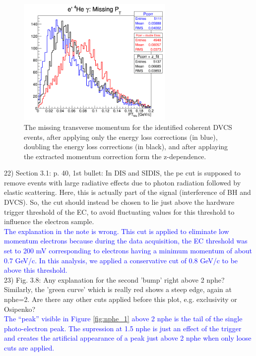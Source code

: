 \begin{figure}[tbp]
   \centering
   \includegraphics[height=6.2cm]{fig/Coh_e4Hegamma_PT_Mis.png}
   \caption{The missing transverse momentum for the identified coherent DVCS 
      events, after applying only the energy loss corrections (in blue), 
      doubling the energy loss corrections (in black), and after applaying the 
   extracted momentum correction form the z-dependence.}
   \label{fig:dvcs_mom_corr}
\end{figure}


22) Section 3.1: p. 40, 1st bullet: In DIS and SIDIS, the pe cut is supposed to 
remove events with large radiative effects due to photon radiation followed by 
elastic scattering. Here, this is actually part of the signal (interference of 
BH and DVCS). So, the cut should instead be chosen to lie just above the 
hardware trigger threshold of the EC, to avoid fluctuating values for this 
threshold to influence the electron sample.\\
\textcolor{blue}{The explanation in the note is wrong. This cut is applied to 
   eliminate low momentum electrons because during the data acquisition, the EC 
   threshold was set to 200 mV corresponding to electrons having a minimum 
momentum of about 0.7 GeV/c. In this analysis, we applied a conservative cut of 
0.8 GeV/c to be above this threshold.}\\

23) Fig. 3.8: Any explanation for the second 'bump' right above 2 nphe? 
Similarly, the 'green curve' which is really red shows a steep edge, again at 
nphe=2. Are there any other cuts applied before this plot, e.g. exclusivity or 
Osipenko?\\
  \textcolor{blue}{The ``peak'' visible in Figure \ref{fig:nphe_1} above 2 
nphe is the tail of the single photo-electron peak. 
The supression at 1.5 nphe is just an effect of the trigger and creates the 
artificial appearance of a peak just above 2 nphe when only loose cuts are 
applied.}\\

